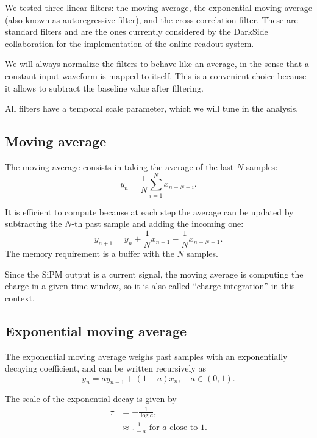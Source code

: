We tested three linear filters: the moving average, the exponential moving
average (also known as autoregressive filter), and the cross correlation
filter. These are standard filters and are the ones currently considered by the
DarkSide collaboration for the implementation of the online readout system.

We will always normalize the filters to behave like an average, in the sense
that a constant input waveform is mapped to itself. This is a convenient choice
because it allows to subtract the baseline value after filtering.

All filters have a temporal scale parameter, which we will tune in the analysis.

\subsection{Moving average}

The moving average consists in taking the average of the last $N$ samples:
%
\begin{equation}
    y_n = \frac1N \sum_{i=1}^N x_{n-N+i}.
\end{equation}

It is efficient to compute because at each step the average can be updated by
subtracting the $N$-th past sample and adding the incoming one:
%
\begin{equation}
    y_{n+1} = y_n + \frac1N x_{n+1} - \frac1N x_{n-N+1}.
\end{equation}
%
The memory requirement is a buffer with the $N$ samples.

Since the SiPM output is a current signal, the moving average is computing the
charge in a given time window, so it is also called ``charge integration'' in
this context.

\subsection{Exponential moving average}

The exponential moving average weighs past samples with an exponentially
decaying coefficient, and can be written recursively as
%
\begin{equation}
    y_n = a y_{n-1} + (1 - a) x_n, \quad a \in (0, 1).
\end{equation}

The scale of the exponential decay is given by
%
\begin{align}
    \tau &= -\frac1{\log a}, \\
    &\approx \frac1{1-a} \text{ for $a$ close to 1.}
\end{align}


